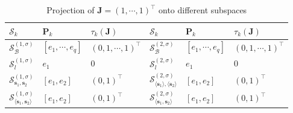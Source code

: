 \documentclass[colorlinks=true, linkcolor=blue, citecolor=blue, urlcolor=blue]{article}
\theoremstyle{plain}
\theoremstyle{definition}
\theoremstyle{remark}
\newcommand{\mcs}{\mathcal{S}}
\begin{document}
\begin{table}[htbp]
\caption{Projection of $\bm J=(1,\cdots,1)^\top$ onto different subspaces}
    \centering
    \begin{tabular}{m{1.8cm}<{\centering}m{2cm}<{\centering}m{2cm}<{\centering}m{1.8cm}<{\centering}m{2cm}<{\centering}m{2cm}<{\centering}}
    \toprule
   
      $\mathcal{S}_k$   & $\bm P_k$ & $\tau_k(\bm J)$ & $\mathcal{S}_k$   & $\bm P_k$ & $\tau_k(\bm J)$ \\
    \midrule    $\mcs_{\mathcal{B}}^{(1,\sigma)}$  & $[e_1,\cdots,e_q]$ & $ (0,1,\cdots,1)^\top$ & $\mcs_{\mathcal{B}}^{(2,\sigma)}$  & $[e_1,\cdots,e_q]$ & $(0,1,\cdots,1)^\top$\\
    $\mcs_{l}^{(1,\sigma)}$  & $e_1$ & $0$ & $\mcs_{l}^{(2,\sigma)}$  & $e_1$ & $0$\\
    $\mcs_{\bm s_1,\bm s_2}^{(1,\sigma)}$  & $[e_1,e_2]$ & $(0,1)^\top$ & $\mcs_{\langle\bm s_1\rangle,\langle\bm s_2\rangle}^{(2,\sigma)}$  & $[e_1,e_2]$ & $(0,1)^\top$\\
    $\mcs_{\langle\bm s_1,\bm s_2\rangle}^{(1,\sigma)}$  & $[e_1,e_2]$ & $(0,1)^\top$& $\mcs_{\langle\bm s_1,\bm s_2\rangle}^{(2,\sigma)}$  & $[e_1,e_2]$ & $(0,1)^\top$\\
    \bottomrule
    \end{tabular}
    \label{tab: projection of J onto type-1 sp}
\end{table}
\end{document}
